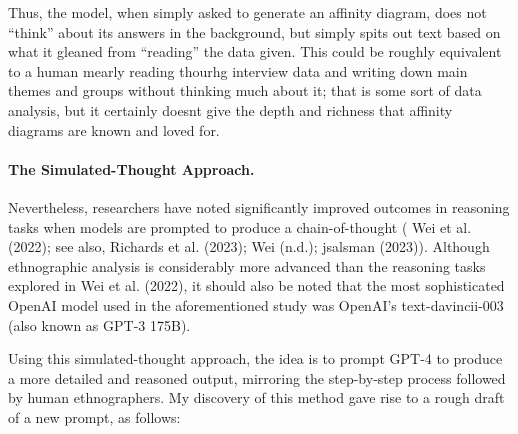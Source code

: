 \documentclass[
]{book}
\begin{document}
Thus, the model, when simply asked to generate an affinity diagram, does not ``think'' about its answers in the background, but simply spits out text based on what it gleaned from ``reading'' the data given. This could be roughly equivalent to a human mearly reading thourhg interview data and writing down main themes and groups without thinking much about it; that is some sort of data analysis, but it certainly doesnt give the depth and richness that affinity diagrams are known and loved for.

\hypertarget{the-simulated-thought-approach.}{%
\paragraph{The Simulated-Thought Approach.}\label{the-simulated-thought-approach.}}

Nevertheless, researchers have noted significantly improved outcomes in reasoning tasks when models are prompted to produce a chain-of-thought ( Wei et al. (2022); see also, Richards et al. (2023); Wei (n.d.); jsalsman (2023)). Although ethnographic analysis is considerably more advanced than the reasoning tasks explored in Wei et al. (2022), it should also be noted that the most sophisticated OpenAI model used in the aforementioned study was OpenAI's text-davincii-003 (also known as GPT-3 175B).

Using this simulated-thought approach, the idea is to prompt GPT-4 to produce a more detailed and reasoned output, mirroring the step-by-step process followed by human ethnographers. My discovery of this method gave rise to a rough draft of a new prompt, as follows:
\end{document}
